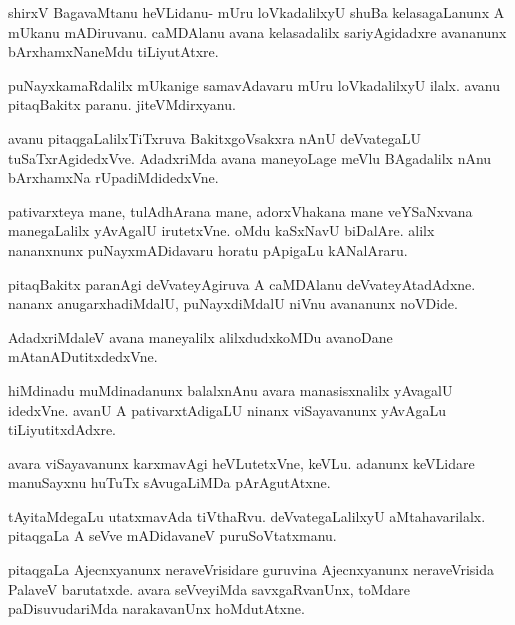 \documentclass{article}
\begin{document}
\begin{mng}%
shirxV BagavaMtanu heVLidanu- mUru loVkadalilxyU shuBa
kelasagaLanunx A mUkanu mADiruvanu. caMDAlanu avana kelasadalilx
sariyAgidadxre avananunx bArxhamxNaneMdu tiLiyutAtxre.
\end{mng}

\begin{mng}%
puNayxkamaRdalilx mUkanige samavAdavaru mUru loVkadalilxyU
ilalx. avanu pitaqBakitx paranu. jiteVMdirxyanu.
\end{mng}

\begin{mng}%
avanu pitaqgaLalilxTiTxruva BakitxgoVsakxra nAnU deVvategaLU
tuSaTxrAgidedxVve. AdadxriMda avana maneyoLage meVlu BAgadalilx nAnu
bArxhamxNa rUpadiMdidedxVne.
\end{mng}

\begin{mng}%
pativarxteya mane, tulAdhArana mane, adorxVhakana mane
veYSaNxvana manegaLalilx yAvAgalU irutetxVne. oMdu kaSxNavU biDalAre. alilx 
nananxnunx puNayxmADidavaru horatu pApigaLu kANalAraru.
\end{mng}

\begin{mng}%
pitaqBakitx paranAgi deVvateyAgiruva A caMDAlanu deVvateyAtadAdxne.
nananx anugarxhadiMdalU, puNayxdiMdalU niVnu avananunx
noVDide.
\end{mng}

\begin{mng}%
AdadxriMdaleV avana maneyalilx alilxdudxkoMDu avanoDane
mAtanADutitxdedxVne.
\end{mng}

\begin{mng}%
hiMdinadu muMdinadanunx balalxnAnu avara manasisxnalilx yAvagalU
idedxVne. avanU A pativarxtAdigaLU ninanx viSayavanunx yAvAgaLu
tiLiyutitxdAdxre.
\end{mng}

\begin{mng}%
avara viSayavanunx karxmavAgi heVLutetxVne, keVLu. adanunx 
keVLidare manuSayxnu huTuTx sAvugaLiMDa pArAgutAtxne.
\end{mng}

\begin{mng}%
tAyitaMdegaLu utatxmavAda tiVthaRvu. deVvategaLalilxyU
aMtahavarilalx. pitaqgaLa A seVve mADidavaneV puruSoVtatxmanu.
\end{mng}

\begin{mng}%
pitaqgaLa Ajecnxyanunx neraveVrisidare guruvina Ajecnxyanunx neraveVrisida PalaveV barutatxde. avara seVveyiMda savxgaRvanUnx, toMdare paDisuvudariMda narakavanUnx hoMdutAtxne.
\end{mng}
\end{document}
